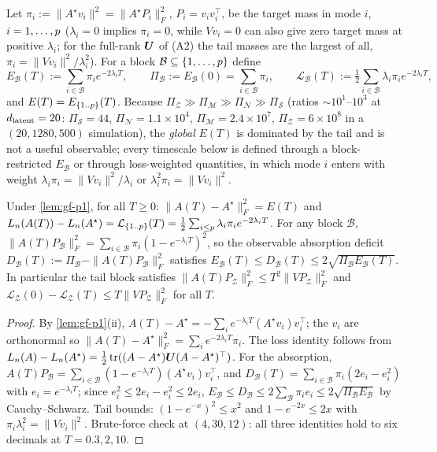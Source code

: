\begin{definition}\label{def:rse-p1}
Let $\pi_i:=\|A^\star v_i\|^2=\|A^\star P_i\|_F^2$, $P_i=v_iv_i^{\top}$, be the target mass in mode $i$, $i=1,\dots,p$ ($\lambda_i=0$ implies $\pi_i=0$, while $Vv_i=0$ can also give zero target mass at positive $\lambda_i$; for the full-rank $\bm{U}$ of (A2) the tail masses are the largest of all, $\pi_i=\|Vv_i\|^2/\lambda_i^2$). For a block $\mathcal B\subseteq\{1,\dots,p\}$ define
\[
E_{\mathcal B}(T):=\sum_{i\in\mathcal B}\pi_ie^{-2\lambda_iT},\qquad \Pi_{\mathcal B}:=E_{\mathcal B}(0)=\sum_{i\in\mathcal B}\pi_i,\qquad
\mathcal L_{\mathcal B}(T):=\tfrac12\sum_{i\in\mathcal B}\lambda_i\pi_ie^{-2\lambda_iT},
\]
and $E(T)=E_{\{1..p\}}(T)$. Because $\Pi_{\mathcal Z}\gg\Pi_{\mathcal M}\gg\Pi_{\mathcal N}\gg\Pi_{\mathcal S}$ (ratios $\sim10^1$--$10^3$ at $d_{\mathrm{latent}}=20$: $\Pi_{\mathcal S}=44$, $\Pi_{\mathcal N}=1.1\times10^4$, $\Pi_{\mathcal M}=2.4\times10^7$, $\Pi_{\mathcal Z}=6\times10^8$ in a $(20,1280,500)$ simulation), the \emph{global} $E(T)$ is dominated by the tail and is not a useful observable; every timescale below is defined through a block-restricted $E_{\mathcal B}$ or through loss-weighted quantities, in which mode $i$ enters with weight $\lambda_i\pi_i=\|Vv_i\|^2/\lambda_i$ or $\lambda_i^2\pi_i=\|Vv_i\|^2$.
\end{definition}

\begin{proposition}\label{prop:rse-p1}
Under \cref{lem:gf-p1}, for all $T\ge0$: $\|A(T)-A^\star\|_F^2=E(T)$ and $L_{n}(A(T))-L_{n}(A^\star)=\mathcal L_{\{1..p\}}(T)=\tfrac12\sum_{i\le p}\lambda_i\pi_ie^{-2\lambda_iT}$. For any block $\mathcal B$, $\|A(T)P_{\mathcal B}\|_F^2=\sum_{i\in\mathcal B}\pi_i(1-e^{-\lambda_iT})^2$, so the observable absorption deficit $D_{\mathcal B}(T):=\Pi_{\mathcal B}-\|A(T)P_{\mathcal B}\|_F^2$ satisfies $E_{\mathcal B}(T)\le D_{\mathcal B}(T)\le2\sqrt{\Pi_{\mathcal B}E_{\mathcal B}(T)}$. In particular the tail block satisfies $\|A(T)P_{\mathcal Z}\|_F^2\le T^2\|VP_{\mathcal Z}\|_F^2$ and $\mathcal L_{\mathcal Z}(0)-\mathcal L_{\mathcal Z}(T)\le T\|VP_{\mathcal Z}\|_F^2$ for all $T$.
\end{proposition}
\begin{proof}
By \cref{lem:gf-p1}(ii), $A(T)-A^\star=-\sum_ie^{-\lambda_iT}(A^\star v_i)v_i^{\top}$; the $v_i$ are orthonormal so $\|A(T)-A^\star\|_F^2=\sum_ie^{-2\lambda_iT}\pi_i$. The loss identity follows from $L_{n}(A)-L_{n}(A^\star)=\tfrac12\operatorname{tr}((A-A^\star)\bm{U}(A-A^\star)^{\top})$. For the absorption, $A(T)P_{\mathcal B}=\sum_{i\in\mathcal B}(1-e^{-\lambda_iT})(A^\star v_i)v_i^{\top}$, and $D_{\mathcal B}(T)=\sum_{i\in\mathcal B}\pi_i(2e_i-e_i^2)$ with $e_i=e^{-\lambda_iT}$; since $e_i^2\le2e_i-e_i^2\le2e_i$, $E_{\mathcal B}\le D_{\mathcal B}\le2\sum_{\mathcal B}\pi_ie_i\le2\sqrt{\Pi_{\mathcal B}E_{\mathcal B}}$ by Cauchy--Schwarz. Tail bounds: $(1-e^{-x})^2\le x^2$ and $1-e^{-2x}\le2x$ with $\pi_i\lambda_i^2=\|Vv_i\|^2$. Brute-force check at $(4,30,12)$: all three identities hold to six decimals at $T=0.3,2,10$.
\end{proof}

